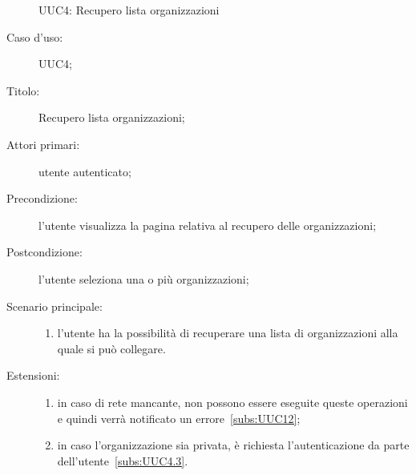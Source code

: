 \documentclass[../../../analisi-dei-requisiti.tex]{subfiles}
\begin{document}
\begin{figure}[H]
  \centering
  \caption{UUC4: Recupero lista organizzazioni}%
  \label{fig:uuc4}
\end{figure}

\begin{description}
  \item[Caso d’uso:] UUC4;
  \item[Titolo:] Recupero lista organizzazioni;
  \item[Attori primari:] utente autenticato;
  \item[Precondizione:] l'utente visualizza la pagina relativa al recupero delle organizzazioni;
  \item[Postcondizione:] l'utente seleziona una o più organizzazioni;
  \item[Scenario principale:]
        \begin{enumerate}
          \item l'utente ha la possibilità di recuperare una lista di organizzazioni alla quale si può collegare.
        \end{enumerate}
  \item[Estensioni:]
        \begin{enumerate}
          \item in caso di rete mancante, non possono essere eseguite queste operazioni e quindi verrà notificato un errore~\ref{subs:UUC12};
          \item in caso l'organizzazione sia privata, è richiesta l'autenticazione da parte dell'utente~\ref{subs:UUC4.3}.
        \end{enumerate}
\end{description}
\end{document}
